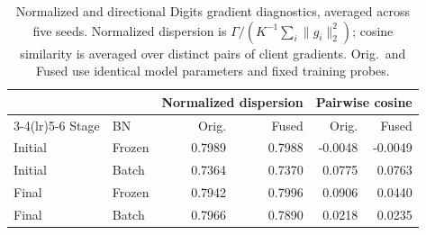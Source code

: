 \begin{table}[t]
\coauthorcolor
\centering
\small
\setlength{\tabcolsep}{13pt}
\caption{Normalized and directional Digits gradient diagnostics, averaged across five seeds. Normalized dispersion is $\Gamma/(K^{-1}\sum_i\|g_i\|_2^2)$; cosine similarity is averaged over distinct pairs of client gradients. Orig.\ and Fused use identical model parameters and fixed training probes.}
\label{tab:digits_gradient_normalized}
\begin{tabular}{llrrrr}
\toprule
& & \multicolumn{2}{c}{Normalized dispersion} & \multicolumn{2}{c}{Pairwise cosine} \\
\cmidrule(lr){3-4}\cmidrule(lr){5-6}
Stage & BN & Orig. & Fused & Orig. & Fused \\
\midrule
Initial & Frozen & 0.7989 & 0.7988 & -0.0048 & -0.0049 \\
Initial & Batch & 0.7364 & 0.7370 & 0.0775 & 0.0763 \\
Final & Frozen & 0.7942 & 0.7996 & 0.0906 & 0.0440 \\
Final & Batch & 0.7966 & 0.7890 & 0.0218 & 0.0235 \\
\bottomrule
\end{tabular}
\end{table}
